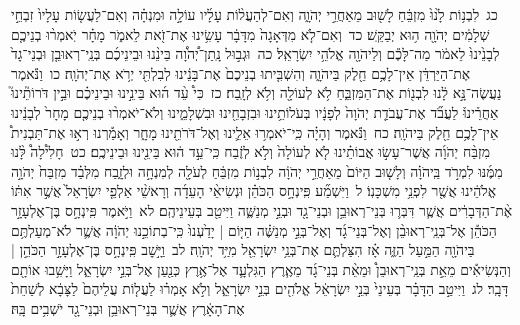 \documentclass[18pt]{article}
\newcommand{\vart}[1]{\Bfootnote{#1}}	%
\begin{document}
 {\loc כג~}לִבְנ֥וֹת לָ֙נוּ֙ מִזְבֵּ֔חַ לָשׁ֖וּב מֵאַחֲרֵ֣י יְהֹוָ֑ה וְאִם־לְהַעֲל֨וֹת עָלָ֜יו עוֹלָ֣ה וּמִנְחָ֗ה וְאִם־לַעֲשׂ֤וֹת עָלָיו֙ זִבְחֵ֣י שְׁלָמִ֔ים יְהֹוָ֖ה ה֥וּא יְבַקֵּֽשׁ׃ \startlock
 {\loc כד~}וְאִם־לֹ֤א מִדְּאָגָה֙ מִדָּבָ֔ר עָשִׂ֥ינוּ אֶת־זֹ֖את לֵאמֹ֑ר מָחָ֗ר יֹֽאמְר֨וּ בְנֵיכֶ֤ם לְבָנֵ֙ינוּ֙ לֵאמֹ֔ר מַה־לָּכֶ֕ם וְלַיהֹוָ֖ה אֱלֹהֵ֥י יִשְׂרָאֵֽל׃ \startlock
 {\loc כה~}וּגְב֣וּל נָֽתַן־יְ֠הֹוָ֠ה בֵּינֵ֨נוּ וּבֵינֵיכֶ֜ם בְּנֵֽי־רְאוּבֵ֤ן וּבְנֵי־גָד֙ אֶת־הַיַּרְדֵּ֔ן אֵין־לָכֶ֥ם חֵ֖לֶק בַּיהֹוָ֑ה וְהִשְׁבִּ֤יתוּ בְנֵיכֶם֙ אֶת־בָּנֵ֔ינוּ לְבִלְתִּ֖י יְרֹ֥א אֶת־יְהֹוָֽה׃ \startlock
 {\loc כו~}וַנֹּ֕אמֶר נַעֲשֶׂה־נָּ֣א לָ֔נוּ לִבְנ֖וֹת אֶת־הַמִּזְבֵּ֑חַ לֹ֥א לְעוֹלָ֖ה וְלֹ֥א לְזָֽבַח׃ \startlock
 {\loc כז~}כִּי֩ עֵ֨ד ה֜וּא בֵּינֵ֣ינוּ וּבֵינֵיכֶ֗ם וּבֵ֣ין דֹּרוֹתֵ֘ינוּ֮ אַחֲרֵ֒ינוּ֒ לַעֲבֹ֞ד אֶת־עֲבֹדַ֤ת יְהֹוָה֙ לְפָנָ֔יו בְּעֹלוֹתֵ֥ינוּ וּבִזְבָחֵ֖ינוּ וּבִשְׁלָמֵ֑ינוּ וְלֹא־יֹאמְר֨וּ בְנֵיכֶ֤ם מָחָר֙ לְבָנֵ֔ינוּ אֵין־לָכֶ֥ם חֵ֖לֶק בַּיהֹוָֽה׃ \startlock
 {\loc כח~}וַנֹּ֕אמֶר וְהָיָ֗ה כִּֽי־יֹאמְר֥וּ אֵלֵ֛ינוּ וְאֶל־דֹּרֹתֵ֖ינוּ מָחָ֑ר וְאָמַ֡רְנוּ רְא֣וּ אֶת־תַּבְנִית֩ מִזְבַּ֨ח יְהֹוָ֜ה אֲשֶׁר־עָשׂ֣וּ אֲבוֹתֵ֗ינוּ לֹ֤א לְעוֹלָה֙ וְלֹ֣א לְזֶ֔בַח כִּֽי־עֵ֣ד ה֔וּא בֵּינֵ֖ינוּ וּבֵינֵיכֶֽם׃ \startlock
 {\loc כט~}חָלִ֩ילָה֩ לָּ֨נוּ מִמֶּ֜נּוּ לִמְרֹ֣ד בַּֽיהֹוָ֗ה וְלָשׁ֤וּב הַיּוֹם֙ מֵאַחֲרֵ֣י יְהֹוָ֔ה לִבְנ֣וֹת מִזְבֵּ֔חַ לְעֹלָ֖ה לְמִנְחָ֣ה וּלְזָ֑בַח מִלְּבַ֗ד מִזְבַּח֙ יְהֹוָ֣ה אֱלֹהֵ֔ינוּ אֲשֶׁ֖ר לִפְנֵ֥י מִשְׁכָּנֽוֹ׃ \startlock
 {\loc ל~}וַיִּשְׁמַ֞ע פִּֽינְחָ֣ס הַכֹּהֵ֗ן וּנְשִׂיאֵ֨י הָעֵדָ֜ה וְרָאשֵׁ֨י אַלְפֵ֤י יִשְׂרָאֵל֙ אֲשֶׁ֣ר אִתּ֔וֹ אֶ֨ת־הַדְּבָרִ֔ים אֲשֶׁ֧ר דִּבְּר֛וּ בְּנֵי־רְאוּבֵ֥ן וּבְנֵי־גָ֖ד וּבְנֵ֣י מְנַשֶּׁ֑ה וַיִּיטַ֖ב בְּעֵינֵיהֶֽם׃ \startlock
 {\loc לא~}וַיֹּ֣אמֶר פִּֽינְחָ֣ס בֶּן־אֶלְעָזָ֣ר הַכֹּהֵ֡ן אֶל־בְּנֵֽי־רְאוּבֵ֨ן וְאֶל־בְּנֵי־גָ֜ד וְאֶל־בְּנֵ֣י מְנַשֶּׁ֗ה הַיּ֤וֹם  |  יָדַ֙עְנוּ֙ כִּֽי־בְתוֹכֵ֣נוּ יְהֹוָ֔ה אֲשֶׁ֛ר לֹא־מְעַלְתֶּ֥ם בַּיהֹוָ֖ה הַמַּ֣עַל הַזֶּ֑ה אָ֗ז הִצַּלְתֶּ֛ם אֶת־בְּנֵ֥י יִשְׂרָאֵ֖ל מִיַּ֥ד יְהֹוָֽה׃ \startlock
 {\loc לב~}וַיָּ֣שׇׁב פִּֽינְחָ֣ס בֶּן־אֶלְעָזָ֣ר הַכֹּהֵ֣ן  |  וְהַנְּשִׂיאִ֡ים מֵאֵ֣ת בְּנֵֽי־רְאוּבֵן֩ וּמֵאֵ֨ת בְּנֵי־גָ֜ד מֵאֶ֧רֶץ הַגִּלְעָ֛ד אֶל־אֶ֥רֶץ כְּנַ֖עַן אֶל־בְּנֵ֣י יִשְׂרָאֵ֑ל וַיָּשִׁ֥בוּ אוֹתָ֖ם דָּבָֽר׃ \startlock
 {\loc לג~}וַיִּיטַ֣ב הַדָּבָ֗ר בְּעֵינֵי֙ בְּנֵ֣י יִשְׂרָאֵ֔ל  \edtext{וַיְבָרְכ֥וּ}{\vart{א=וַיְבָרֲכ֥וּ | }}  אֱלֹהִ֖ים בְּנֵ֣י יִשְׂרָאֵ֑ל וְלֹ֣א אָמְר֗וּ לַעֲל֤וֹת עֲלֵיהֶם֙ לַצָּבָ֔א לְשַׁחֵת֙ אֶת־הָאָ֔רֶץ אֲשֶׁ֛ר בְּנֵי־רְאוּבֵ֥ן וּבְנֵי־גָ֖ד יֹשְׁבִ֥ים בָּֽהּ׃ \startlock
\end{document}
